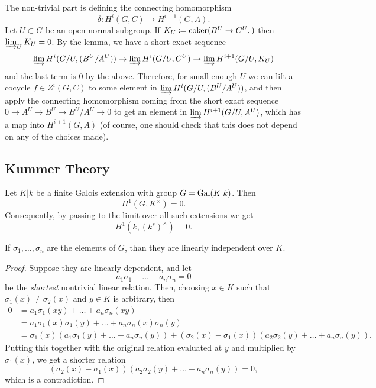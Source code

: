 \documentclass{article}
\begin{document}
The non-trivial part is defining the connecting homomorphism
\[
	\delta: H^i(G,C) \to H^{i+1}(G,A).
\]
Let $U\subset G$ be an open normal subgroup. If $K_U\coloneqq \operatorname{coker}(B^U\to C^U,)$ then $\varinjlim_U K_U=0$. By the lemma, we have a short exact sequence
\[
	\varinjlim H^i(G/U,(B^U/A^U)) \to \varinjlim H^i(G/U,C^U) \to \varinjlim H^{i+1}(G/U,K_U) 
\]
and the last term is $0$ by the above. Therefore, for small enough $U$ we can lift a cocycle $f\in Z^i(G,C)$ to some element in $\varinjlim H^i(G /U,(B^U/A^U))$, and then apply the connecting homomorphism coming from the short exact sequence $0\to A^U \to B^U\to B^U/A^U\to 0$ to get an element in $\varinjlim H^{i+1}(G/U,A^U)$, which has a map into $H^{i+1}(G,A)$ (of course, one should check that this does not depend on any of the choices made).

\subsection{Kummer Theory}
\begin{prop}
	Let $K|k$ be a finite Galois extension with group $G=\operatorname{Gal}(K|k)$. Then
	\[
		H^1(G,K^\times) = 0.
	\]
	Consequently, by passing to the limit over all such extensions we get
	\[
	 	H^1(k,(k^s)^\times) = 0.
	\]
		
\end{prop}
\begin{lem}[Dedekind]
	If $\sigma_1,\ldots,\sigma_n$ are the elements of $G$, than they are linearly independent over $K$.
\end{lem}
\begin{proof}
		Suppose they are linearly dependent, and let
		\[
			a_1\sigma_1+\ldots+a_n\sigma_n=0
		\]
		be the \textit{shortest} nontrivial linear relation. Then, choosing $x\in K$ such that $\sigma_1(x)\ne \sigma_2(x)$ and $y\in K$ is arbitrary, then
		\begin{align*}
			0 & = a_1\sigma_1(xy)+\ldots+a_n\sigma_n(xy) \\
			  & = a_1\sigma_1(x)\sigma_1(y)+\ldots+a_n\sigma_n(x)\sigma_n(y) \\
			  & = \sigma_1(x)(a_1\sigma_1(y)+\ldots+a_n\sigma_n(y)) + (\sigma_2(x)-\sigma_1(x))(a_2\sigma_2(y)+\ldots+a_n\sigma_n(y)).
		\end{align*}
		Putting this together with the original relation evaluated at $y$ and multiplied by $\sigma_1(x)$, we get a shorter relation
		\[
			(\sigma_2(x)-\sigma_1(x))(a_2\sigma_2(y)+\ldots+a_n\sigma_n(y)) = 0,
		\]
		which is a contradiction.
\end{proof}
\end{document}
